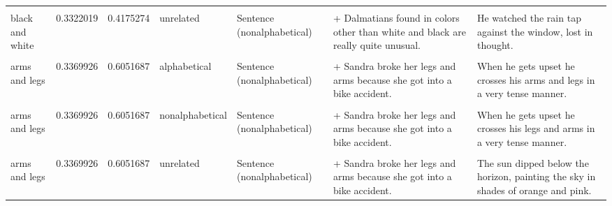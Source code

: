 \documentclass[
  12pt,
]{scrartcl}
\begin{document}
\begin{landscape}
\begin{longtable}{lrrllll}
\cellcolor{gray!6}{black and white} & \cellcolor{gray!6}{0.3322019} & \cellcolor{gray!6}{0.4175274} & \cellcolor{gray!6}{unrelated} & \cellcolor{gray!6}{Sentence (alphabetical)} & \cellcolor{gray!6}{+ Dalmatians found in colors other than black and white are really quite unusual.} & \cellcolor{gray!6}{He watched the rain tap against the window, lost in thought.}\\
\addlinespace
black and white & 0.3322019 & 0.4175274 & unrelated & Sentence (nonalphabetical) & + Dalmatians found in colors other than white and black are really quite unusual. & He watched the rain tap against the window, lost in thought.\\
\cellcolor{gray!6}{arms and legs} & \cellcolor{gray!6}{0.3369926} & \cellcolor{gray!6}{0.6051687} & \cellcolor{gray!6}{alphabetical} & \cellcolor{gray!6}{Sentence (alphabetical)} & \cellcolor{gray!6}{+ Sandra broke her arms and legs because she got into a bike accident.} & \cellcolor{gray!6}{When he gets upset he crosses his arms and legs in a very tense manner.}\\
arms and legs & 0.3369926 & 0.6051687 & alphabetical & Sentence (nonalphabetical) & + Sandra broke her legs and arms because she got into a bike accident. & When he gets upset he crosses his arms and legs in a very tense manner.\\
\cellcolor{gray!6}{arms and legs} & \cellcolor{gray!6}{0.3369926} & \cellcolor{gray!6}{0.6051687} & \cellcolor{gray!6}{nonalphabetical} & \cellcolor{gray!6}{Sentence (alphabetical)} & \cellcolor{gray!6}{+ Sandra broke her arms and legs because she got into a bike accident.} & \cellcolor{gray!6}{When he gets upset he crosses his legs and arms in a very tense manner.}\\
arms and legs & 0.3369926 & 0.6051687 & nonalphabetical & Sentence (nonalphabetical) & + Sandra broke her legs and arms because she got into a bike accident. & When he gets upset he crosses his legs and arms in a very tense manner.\\
\addlinespace
\cellcolor{gray!6}{arms and legs} & \cellcolor{gray!6}{0.3369926} & \cellcolor{gray!6}{0.6051687} & \cellcolor{gray!6}{unrelated} & \cellcolor{gray!6}{Sentence (alphabetical)} & \cellcolor{gray!6}{+ Sandra broke her arms and legs because she got into a bike accident.} & \cellcolor{gray!6}{The sun dipped below the horizon, painting the sky in shades of orange and pink.}\\
arms and legs & 0.3369926 & 0.6051687 & unrelated & Sentence (nonalphabetical) & + Sandra broke her legs and arms because she got into a bike accident. & The sun dipped below the horizon, painting the sky in shades of orange and pink.\\

\end{longtable}
\end{landscape}
\end{document}
